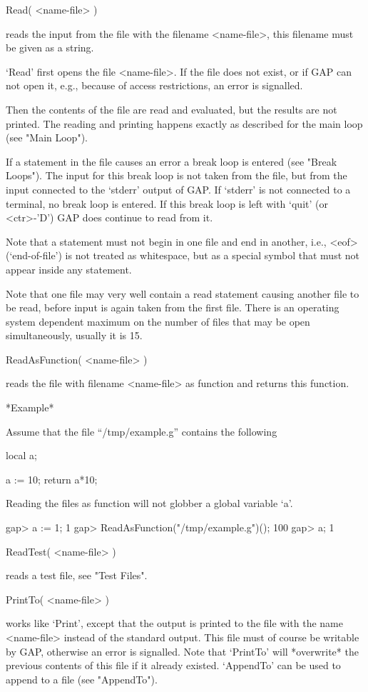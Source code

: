 \>Read( <name-file> )

reads   the input from  the  file  with  the  filename <name-file>,  this
filename must be given as a string.

`Read' first opens the file <name-file>.  If the file  does not exist, or
if GAP can not open it, e.g., because of access restrictions, an error is
signalled.

Then the contents of the file are read and evaluated, but the results are
not printed.  The reading and  printing happens exactly as described  for
the main loop (see "Main Loop").

If a statement in the file causes  an error a  break loop is entered (see
"Break  Loops").  The input   for this break loop  is  not taken from the
file, but from  the input connected to the  `stderr'  output of GAP.   If
`stderr' is not connected  to a terminal, no break  loop is  entered.  If
this break loop is left  with `quit' (or <ctr>-'D')  GAP does continue to
read from it.

Note that  a statement must  not begin in one  file  and end  in another,
i.e.,  <eof> (`end-of-file') is not    treated as whitespace,  but as   a
special symbol that must not appear inside any statement.

Note that one file may very well contain a read statement causing another
file to be read, before input is again taken from the  first file.  There
is an operating system dependent maximum on the  number of files that may
be open simultaneously, usually it is 15.

\>ReadAsFunction( <name-file> )

reads the  file  with filename <name-file> as  function  and returns this
function.

*Example*

Assume that the file ``/tmp/example.g'' contains the following

\begintt
    local a;

    a := 10;
    return a*10;
\endtt

Reading the files as function will not globber a global variable `a'.

\begintt
    gap> a := 1;
    1
    gap> ReadAsFunction("/tmp/example.g")();
    100
    gap> a;
    1
\endtt

\>ReadTest( <name-file> )

reads a test file, see "Test Files".

\>PrintTo( <name-file> )

works like `Print',  except that the output  is printed to the  file with
the name <name-file>  instead of the standard output.   This file must of
course be writable by  GAP, otherwise an  error is signalled.  Note  that
`PrintTo' will  *overwrite*  the  previous contents  of  this file  if it
already existed.  `AppendTo'  can   be used to   append to  a file   (see
"AppendTo").
    
